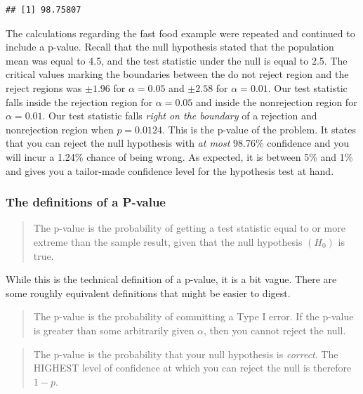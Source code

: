 \documentclass[
]{book}
\begin{document}
\begin{verbatim}
## [1] 98.75807
\end{verbatim}

The calculations regarding the fast food example were repeated and continued to include a p-value. Recall that the null hypothesis stated that the population mean was equal to 4.5, and the test statistic under the null is equal to 2.5. The critical values marking the boundaries between the do not reject region and the reject regions was \(\pm 1.96\) for \(\alpha=0.05\) and \(\pm 2.58\) for \(\alpha=0.01\). Our test statistic falls inside the rejection region for \(\alpha=0.05\) and inside the nonrejection region for \(\alpha=0.01\). Our test statistic falls \emph{right on the boundary} of a rejection and nonrejection region when \(p=0.0124\). This is the p-value of the problem. It states that you can reject the null hypothesis with \emph{at most} 98.76\% confidence and you will incur a 1.24\% chance of being wrong. As expected, it is between 5\% and 1\% and gives you a tailor-made confidence level for the hypothesis test at hand.

\hypertarget{the-definitions-of-a-p-value}{%
\subsubsection*{The definitions of a P-value}\label{the-definitions-of-a-p-value}}

\begin{quote}
The p-value is the probability of getting a test statistic equal to or more extreme than the sample result, given that the null hypothesis \((H_0)\) is true.
\end{quote}

While this is the technical definition of a p-value, it is a bit vague. There are some roughly equivalent definitions that might be easier to digest.

\begin{quote}
The p-value is the probability of committing a Type I error. If the p-value is greater than some arbitrarily given \(\alpha\), then you cannot reject the null.
\end{quote}

\begin{quote}
The p-value is the probability that your null hypothesis is \emph{correct}. The HIGHEST level of confidence at which you can reject the null is therefore \(1-p\).
\end{quote}
\end{document}
